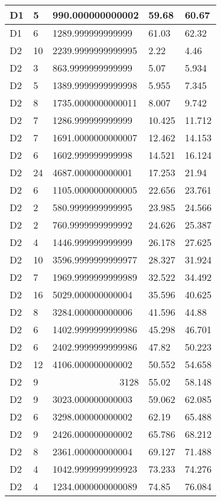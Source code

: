 \begin{longtable}{|l|l|l|l|l|}
D1 & 5 & 990.000000000002 & 59.68 & 60.67 \\ \hline
D1 & 6 & 1289.999999999999 & 61.03 & 62.32 \\ \hline
D2 & 10 & 2239.9999999999995 & 2.22 & 4.46 \\ \hline
D2 & 3 & 863.9999999999999 & 5.07 & 5.934 \\ \hline
D2 & 5 & 1389.9999999999998 & 5.955 & 7.345 \\ \hline
D2 & 8 & 1735.0000000000011 & 8.007 & 9.742 \\ \hline
D2 & 7 & 1286.999999999999 & 10.425 & 11.712 \\ \hline
D2 & 7 & 1691.0000000000007 & 12.462 & 14.153 \\ \hline
D2 & 6 & 1602.999999999998 & 14.521 & 16.124 \\ \hline
D2 & 24 & 4687.000000000001 & 17.253 & 21.94 \\ \hline
D2 & 6 & 1105.0000000000005 & 22.656 & 23.761 \\ \hline
D2 & 2 & 580.9999999999995 & 23.985 & 24.566 \\ \hline
D2 & 2 & 760.9999999999992 & 24.626 & 25.387 \\ \hline
D2 & 4 & 1446.999999999999 & 26.178 & 27.625 \\ \hline
D2 & 10 & 3596.9999999999977 & 28.327 & 31.924 \\ \hline
D2 & 7 & 1969.9999999999989 & 32.522 & 34.492 \\ \hline
D2 & 16 & 5029.000000000004 & 35.596 & 40.625 \\ \hline
D2 & 8 & 3284.000000000006 & 41.596 & 44.88 \\ \hline
D2 & 6 & 1402.9999999999986 & 45.298 & 46.701 \\ \hline
D2 & 6 & 2402.9999999999986 & 47.82 & 50.223 \\ \hline
D2 & 12 & 4106.000000000002 & 50.552 & 54.658 \\ \hline
D2 & 9 & \multicolumn{1}{r|}{3128} & 55.02 & 58.148 \\ \hline
D2 & 9 & 3023.000000000003 & 59.062 & 62.085 \\ \hline
D2 & 6 & 3298.000000000002 & 62.19 & 65.488 \\ \hline
D2 & 9 & 2426.000000000002 & 65.786 & 68.212 \\ \hline
D2 & 8 & 2361.000000000004 & 69.127 & 71.488 \\ \hline
D2 & 4 & 1042.9999999999923 & 73.233 & 74.276 \\ \hline
D2 & 4 & 1234.0000000000089 & 74.85 & 76.084 \\ \hline

\end{longtable}
